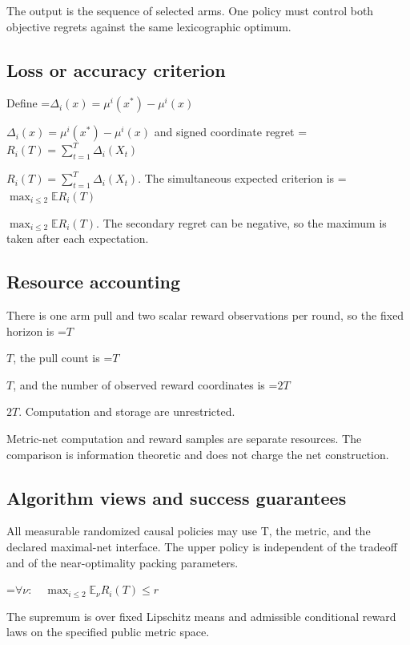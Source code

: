 \documentclass[10pt,a4paper]{article}
\newcommand{\AtlasMath}[1]{\par\begingroup\centering\setbox0=\hbox{$\displaystyle #1$}\ifdim\wd0>1.4\linewidth\typeout{ATLAS WIDE FORMULA: \the\wd0}\fi\ifdim\wd0>\linewidth\resizebox{\linewidth}{!}{\box0}\else\box0\fi\par\endgroup}
\newcommand{\AtlasInlineMath}[1]{\begingroup\setbox0=\hbox{$#1$}\ifdim\wd0>.4\linewidth\endgroup\AtlasMath{#1}\else\endgroup$#1$\fi}
\begin{document}
The output is the sequence of selected arms. One policy must control both objective regrets against the same lexicographic optimum.



\subsection{Loss or accuracy criterion}


Define \AtlasInlineMath{\Delta_i(x)=\mu^i(x^*)-\mu^i(x)} and signed coordinate regret \AtlasInlineMath{R_i(T)=\sum_{t=1}^T\Delta_i(X_t)}. The simultaneous expected criterion is \AtlasInlineMath{\max_{i\le2}\mathbb E R_i(T)}. The secondary regret can be negative, so the maximum is taken after each expectation.



\subsection{Resource accounting}


There is one arm pull and two scalar reward observations per round, so the fixed horizon is \AtlasInlineMath{T}, the pull count is \AtlasInlineMath{T}, and the number of observed reward coordinates is \AtlasInlineMath{2T}. Computation and storage are unrestricted.



Metric-net computation and reward samples are separate resources. The comparison is information theoretic and does not charge the net construction.



\subsection{Algorithm views and success guarantees}


All measurable randomized causal policies may use T, the metric, and the declared maximal-net interface. The upper policy is independent of the tradeoff and of the near-optimality packing parameters.




\AtlasMath{\forall\nu:\quad\max_{i\le2}\mathbb E_\nu R_i(T)\le r}




The supremum is over fixed Lipschitz means and admissible conditional reward laws on the specified public metric space.
\end{document}

